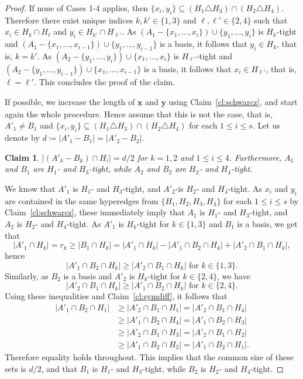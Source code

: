 \documentclass[11pt,a4paper]{article}
\theoremstyle{plain}
\newtheorem{cl}[thm]{Claim}
\theoremstyle{definition}
\newenvironment{claimproof}[1][\proofname]
  {%
    \proof[#1]%
      \renewcommand*\qedsymbol{$\bullet$}%
  }
  {%
    \endproof%
  }
\newcommand{\ul}[1]{\underline{\mathbf{#1}}}
\begin{document}
\begin{proof}
\begin{claimproof}
If none of Cases 1-4 applies, then $\{x_i,y_i\}\subseteq (H_1\triangle H_3)\cap (H_2\triangle H_4)$. Therefore there exist unique indices $k, k' \in \{1,3\}$ and $\ell, \ell' \in \{2,4\}$ such that $x_i \in H_k \cap H_\ell$ and $y_i \in H_{k'} \cap H_{\ell'}$. As $(A_1-\{x_1,\dots,x_i\})\cup\{y_1,\dots,y_i\}$ is $H_k$-tight and $(A_1-\{x_1,\dots,x_{i-1}\})\cup\{y_1,\dots,y_{i-1}\}$ is a basis, it follows that $y_i \in H_k$, that is, $k=k'$. As $(A_2-\{y_1,\dots,y_i\})\cup\{x_1,\dots,x_i\}$ is $H_{\ell'}$-tight and $(A_2-\{y_1,\dots,y_{i-1}\})\cup\{x_1,\dots,x_{i-1}\}$ is a basis, it follows that $x_i \in H_{\ell '}$, that is, $\ell = \ell'$. This concludes the proof of the claim. 
\end{claimproof}

If possible, we increase the length of $\ul{x}$ and $\ul{y}$ using Claim~\ref{cl:schwarcz}, and start again the whole procedure. Hence assume that this is not the case, that is, $A'_1\neq B_1$ and $\{x_i,y_i\}\subseteq (H_1\triangle H_3)\cap (H_2\triangle H_4)$ for each $1 \le i \le s$. Let us denote by $d\coloneqq |A'_1-B_1|=|A'_2-B_2|$. 

\begin{cl}\label{cl:tight}
$|(A'_k-B_k)\cap H_i|=d/2$ for $k=1,2$ and $1\leq i\leq 4$. Furthermore, $A_1$ and $B_1$ are $H_1$- and $H_3$-tight, while $A_2$ and $B_2$ are $H_2$- and $H_4$-tight.
\end{cl}
\begin{claimproof} 
We know that $A'_1$ is $H_1$- and $H_3$-tight, and $A'_2$-is $H_2$- and $H_4$-tight. As $x_i$ and $y_i$ are contained in the same hyperedges from $\{H_1, H_2, H_3, H_4\}$ for each $1\le i \le s$ by Claim~\ref{cl:schwarcz}, these immediately imply that $A_1$ is $H_1$- and $H_3$-tight, and $A_2$ is $H_2$- and $H_4$-tight. %
As $A'_1$ is $H_k$-tight for $k\in\{1,3\}$ and $B_1$ is a basis, we get that \[|A'_1 \cap H_k| = r_k \ge |B_1 \cap H_k| = |A'_1 \cap H_k| - |A'_1 \cap B_2 \cap H_k| + |A'_2 \cap B_1 \cap H_k|,\]
hence 
\[|A'_1 \cap B_2 \cap H_k| \ge |A'_2 \cap B_1 \cap H_k| \text{ for $k\in \{1,3\}$}.\]
Similarly, as $B_2$ is a basis and $A'_2$ is $H_k$-tight for $k\in\{2,4\}$, we have
\[|A'_2 \cap B_1 \cap H_k| \ge |A'_1 \cap B_2 \cap H_k| \text{ for $k\in \{2,4\}$}.\]
Using these inequalities and Claim~\ref{cl:symdiff}, it follows that
\begin{align*}
    |A'_1\cap B_2\cap H_1|
    {}&{}\geq |A'_2\cap B_1\cap H_1|=|A'_2\cap B_1\cap H_4|\\
    {}&{}\geq |A'_1\cap B_2\cap H_4|=|A'_1\cap B_2\cap H_3|\\
    {}&{}\geq |A'_2\cap B_1\cap H_3|=|A'_2\cap B_1\cap H_2|\\
    {}&{}\geq |A'_1\cap B_2\cap H_2|=|A'_1\cap B_2\cap H_1|.
\end{align*}
Therefore equality holds throughout. This implies that the common size of these sets is $d/2$, and that $B_1$ is $H_1$- and $H_3$-tight, while $B_2$ is $H_2$- and $H_4$-tight.
\end{claimproof}


\end{proof}
\end{document}
